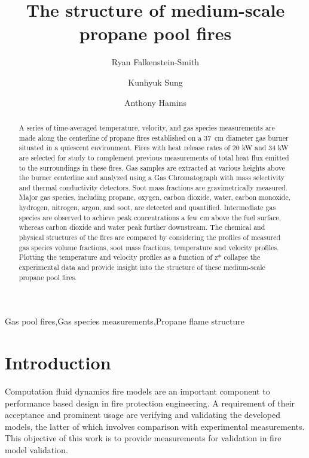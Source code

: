 \documentclass[12pt]{ussci}
\title{The structure of medium-scale propane pool fires}
\author[*1]{Ryan Falkenstein-Smith}
\author{Kunhyuk Sung}
\author{Anthony Hamins}
\affil[1]{National Institute of Standards and Technology, Gaithersburg, MD, USA}
\affil[*]{Corresponding author: \email{ryan.falkenstein-smith@nist.gov}}
\begin{document}
\maketitle

\begin{abstract} %
A series of time-averaged temperature, velocity, and gas species measurements are made along the centerline of propane fires established on a 37~cm diameter gas burner situated in a quiescent environment.  Fires with heat release rates of 20 kW and 34 kW are selected for study to complement previous measurements of total heat flux emitted to the surroundings in these fires. Gas samples are extracted at various heights above the burner centerline and analyzed using a Gas Chromatograph with mass selectivity and thermal conductivity detectors. Soot mass fractions are gravimetrically measured. Major gas species, including propane, oxygen, carbon dioxide, water, carbon monoxide, hydrogen, nitrogen, argon, and soot, are detected and quantified. Intermediate gas species are observed to achieve peak concentrations a few cm above the fuel surface, whereas carbon dioxide and water peak further downstream. The chemical and physical structures of the fires are compared by considering the profiles of measured gas species volume fractions, soot mass fractions, temperature and velocity profiles.  Plotting the temperature and velocity profiles as a function of z* collapse the experimental data and provide insight into the structure of these medium-scale propane pool fires.
\end{abstract}

\begin{keyword}
 Gas pool fires\sep Gas species measurements\sep Propane flame structure
\end{keyword}

\section{Introduction}
%
Computation fluid dynamics fire models are an important component to performance based design in fire protection engineering. A requirement of their acceptance and prominent usage are verifying and validating the developed models, the latter of which involves comparison with experimental measurements. This objective of this work is to provide measurements for validation in fire model validation. 
\end{document}
